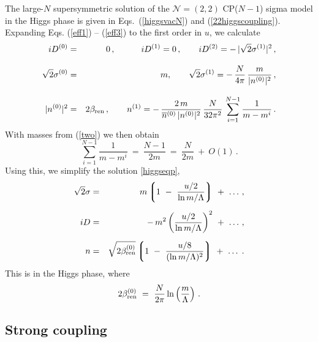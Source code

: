 \documentclass[epsfig,12pt]{article}
\def\beq{\begin{equation}}
\def\eeq{\end{equation}}
\def\beqn{\begin{eqnarray}}
\def\eeqn{\end{eqnarray}}
\def\beqn{\begin{eqnarray}}
\def\eeqn{\end{eqnarray}}
\def\beq{\begin{equation}}
\def\eeq{\end{equation}}
\newcommand{\ntwot}{${\mathcal N}= \left(2,2\right) $ }
\newcommand{\ov}{\overline}
\newcommand{\lgr}{\left\lgroup}
\newcommand{\rgr}{\right\rgroup}
\newcommand{\nz}{{n^{(0)}}}
\newcommand{\no}{{n^{(1)}}}
\newcommand{\bnz}{{\ov{n}{}^{(0)}}}
\newcommand{\Dz}{{D^{(0)}}}
\newcommand{\Do}{{D^{(1)}}}
\newcommand{\sigz}{{\sigma^{(0)}}}
\newcommand{\sigo}{{\sigma^{(1)}}}
\begin{document}
{	The large-$N$ supersymmetric solution of the \ntwot CP($N-1$) sigma model
	in the Higgs phase is
given in Eqs.~(\ref{higgsvacN}) and (\ref{22higgscoupling}).
Expanding Eqs. (\ref{eff1}) -- (\ref{eff3}) to the first order in $u$, we calculate
\beqn
	i \Dz 
	&=&
	 0\,,                    \qquad\quad      i\Do   = 0\,,  
			\qquad iD^{(2)} =  -\,|\sqrt{2}\sigo|^2\,, 
			\nonumber\\[3mm]
	\sqrt{2}\sigz &=& m,  \qquad       
	\sqrt{2}\sigo  = -\,\frac{N}{4\pi}\,\frac{m}{|\nz|^2}\,, 
	 \nonumber\\[3mm]
	|\nz|^2 
	&=&
	2\beta_{\rm ren}\,,              \qquad   
	\no =  -\,\frac{2\,m}{\bnz\,|\nz|^2}\,\frac{N}{32\pi^2}\,\sum_{i=1}^{N-1} \frac{1}{m - m^i}\,.
			\label{higgseqp}
			\eeqn
	With masses from (\ref{two}) we then obtain
\beq
	\sum_{i=1}^{N-1} \frac{1}{m - m^i} ~=~ \frac{N-1}{2m} ~=~ \frac{N}{2m} ~+~ O(1)\,.
	\label{higgseqpp}
\eeq
Using this, we simplify the solution \eqref{higgseqp},
\beqn
%
	\sqrt{2}\sigma 
	&=&
	 m \lgr 1 ~-~ \frac{u/2}{{\rm ln}\, m/\Lambda} \rgr ~+~ \ldots \,,
	\nonumber\\[2mm]
%
	i D  
	&=&
	-\, m^2 \left( \frac{u/2}{{\rm ln}\, m/\Lambda} \right)^2  ~+~ \ldots\,,
	 \label{finhi}
	\\[2mm]
%
	n 
	&=&
	\sqrt{2\beta^{(0)}_{\rm ren}} \lgr 
			1 ~-~ \frac{ u/8 } { ( {\rm ln}\, m/\Lambda )^2 } \rgr ~+~ \ldots\;.
	\nonumber
\eeqn
This is in the Higgs phase, where
$$
2\beta^{(0)}_{\rm ren} ~=~ \frac{N}{2\pi}\,{\rm ln}\left(\frac{m}{\Lambda}\right)\,.
$$

%
%
\subsection{Strong coupling}
\label{subsestrco}


}
\end{document}
